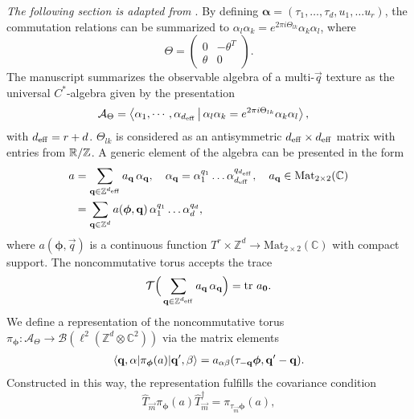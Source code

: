 \documentclass[
    aps,
    prb,
    twocolumn,
    floatfix,
    superscriptaddress,
	10pt
]{revtex4-2}
\begin{document}
{\it The following section is adapted from \cite{Liu2022}}. By defining $\boldsymbol{\alpha}=(\tau_1, \ldots, \tau_d, u_1,\ldots u_r )$, the commutation relations can be summarized to $\alpha_l \alpha_k = e^{2 \pi i \Theta_{lk}} \alpha_k  \alpha_l$, where
\begin{equation}
    \Theta = \begin{pmatrix}
    0 & -\theta^T \\
    \theta & 0
    \end{pmatrix} .
\end{equation}
The manuscript summarizes the observable algebra of a multi-$\vec{q}$ texture as the universal $C^\ast$-algebra given by the presentation
\begin{align}
    \mathcal{A}_\Theta &= \Braket{ \alpha_1, \cdots, \alpha_{{d_\mathrm{eff}}}
    |  \alpha_l \alpha_k = e^{ 2 \pi i \Theta_{lk}} \alpha_k  \alpha_l },
\end{align}
with ${d_\mathrm{eff}} = r+ d$.
$ \Theta_{lk}$ is considered as an antisymmetric  ${d_\mathrm{eff}}\times {d_\mathrm{eff}}$  matrix with entries from ${\mathbb R}/{\mathbb Z}$.
A generic element of the algebra can be presented in the form
\begin{align}
a & = \sum_{\mathbf{q} \in {\mathbb Z}^{{d_\mathrm{eff}}}} a_{\mathbf{q}}
\, \alpha_{\mathbf{q}}, \quad \alpha_{\mathbf{q}} =\alpha_1^{q_1} \ldots\alpha_{d_\mathrm{eff}}^{q_{d_\mathrm{eff}}}, \quad a_{\mathbf{q}} \in \mathrm{Mat}_{2\times2} (\mathbb{C})
\notag \\
& = 	\sum_{\mathbf{q} \in {\mathbb Z}^{d}} a( \boldsymbol{\phi}, \mathbf{q}) 
\, 
\alpha_1^{q_1} \ldots\alpha_d^{q_d},
\end{align}
where $ a(\boldsymbol{\phi},\vec{q}) $  is a continuous function $T^r \times \mathbb{Z}^d \to \mathrm{Mat}_{2\times 2}(\mathbb{C})$ with compact support.
The noncommutative torus accepts the trace
\begin{equation}
	\mathcal{T} \Big(
		\sum_{\mathbf{q} \in {\mathbb Z}^{{d_\mathrm{eff}}}} a_{\mathbf{q}}
\, \alpha_{\mathbf{q}}
	\Big)
	= \mathrm{tr}~ a_{\mathbf{0}} .
\end{equation}
We define a representation of the noncommutative torus $\pi_{\boldsymbol{\phi}} \colon \mathcal{A}_\Theta \to \mathcal{B}(\ell^2(\mathbb{Z}^d \otimes \mathbb{C}^2))$ via the matrix elements
\begin{align}
	\braket{\mathbf{q}, \alpha
	|
	\pi_{\boldsymbol{\phi}} (a)
	| \mathbf{q}', \beta
	}
	=
	a_{\alpha \beta} ( \tau_{-\mathbf{q}} \boldsymbol{\phi}, \mathbf{q}'-\mathbf{q}) .
\end{align}
Constructed in this way, the representation fulfills the covariance condition
\begin{equation}
	\hat{T}_{\vec{m}}
	\pi_{\boldsymbol{\phi}} (a)
	\hat{T}_{\vec{m}}^\dagger
	= \pi_{\tau_{\vec{m}}\boldsymbol{\phi}} (a) ,
\end{equation}
\end{document}
